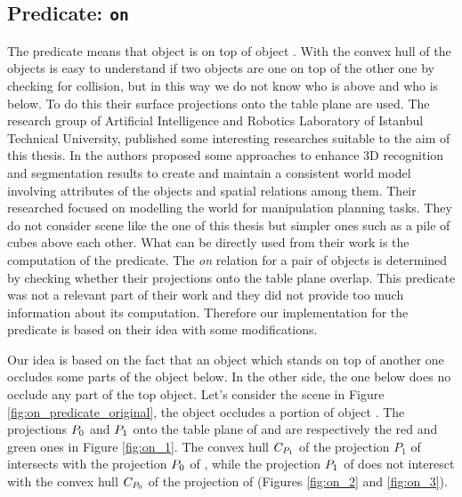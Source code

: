 \subsection{Predicate: \texttt{on}}
The  predicate means that object  is on top of object . With the convex hull of the objects is easy to understand if two objects are one on top of the other one by checking for collision, but in this way we do not know who is above and who is below. To do this their surface projections onto the table plane are used. 
The research group of Artificial Intelligence and Robotics Laboratory of
Istanbul Technical University, published some interesting researches suitable to the aim of this thesis. In \citep{ersen2014scene} \citep{SSS147762} \citep{ersen2013extracting} the authors proposed some approaches to enhance
 3D recognition and segmentation results to create and maintain a consistent world model involving attributes of the objects and spatial relations among them. Their researched focused on modelling the world for manipulation planning tasks. They do not consider scene like the one of this thesis but simpler ones such as  a pile of cubes above each other. What can be directly used from their work is the computation of the  predicate. The \textit{on} relation for a pair of objects is determined by checking whether their projections onto the table plane overlap. This predicate was not a relevant part of their work and they did not provide too much information about its computation. Therefore our implementation for the  predicate is based on their idea with some modifications. 
 
Our idea is based on the fact that an object which stands on top of another one occludes some parts of the object below. In the other side, the one below does no occlude any part of the top object. 
Let's consider the scene in Figure \ref{fig:on_predicate_original}, the object  occludes a portion of object . The projections ${\sc P_{0}}$ and ${\sc P_{1}}$ onto the table plane of  and  are respectively the red and green ones in Figure \ref{fig:on_1}. The convex hull ${\sc C_{P_{1}}}$ of the projection $P_{1}$ of  intersects with the projection ${\sc P_{0}}$ of , while the projection ${\sc P_{1}}$ of  does not interesct with the convex hull ${\sc C_{P_{0}}}$ of the projection of  (Figures \ref{fig:on_2} and \ref{fig:on_3}). 


